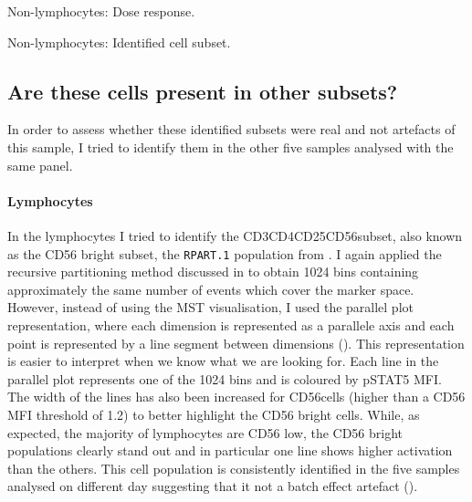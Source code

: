 { Non-lymphocytes: Dose response. }
{ }


{ Non-lymphocytes: Identified cell subset. }
{ }


\clearpage

\subsection{Are these cells present in other subsets?}

In order to assess whether these identified subsets were real and not artefacts of this sample, I tried to identify them in the other five samples analysed with the same panel.

\paragraph{Lymphocytes}

In the lymphocytes I tried to identify the CD3\negative CD4\negative CD25\negative CD56\positive  subset, also known as the CD56 bright subset, the \texttt{RPART.1} population from .
I again applied the recursive partitioning method discussed in  to obtain 1024 bins containing approximately the same number of events which cover the marker space.
However, instead of using the \gls{MST} visualisation, I used the parallel plot representation, where each dimension is represented as a parallele axis and each point is represented by a line segment between dimensions ().
This representation is easier to interpret when we know what we are looking for.
Each line in the parallel plot represents one of the 1024 bins and is coloured by pSTAT5 MFI.
The width of the lines has also been increased for CD56\positive cells (higher than a CD56 MFI threshold of 1.2) to better highlight the CD56 bright cells.
While, as expected, the majority of lymphocytes are CD56 low, the CD56 bright populations clearly stand out and in particular one line shows higher activation than the others.
This cell population is consistently identified in the five samples analysed on different day suggesting that it not a batch effect artefact ().

